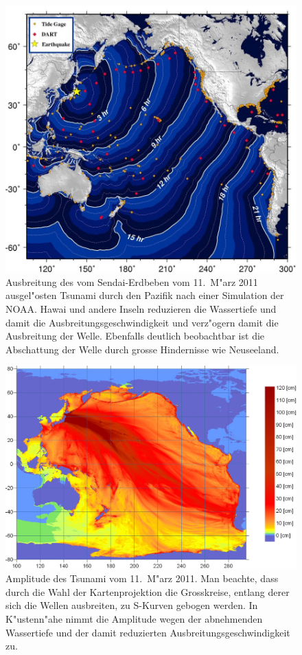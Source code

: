 \begin{figure}
\begin{center}
\includegraphics[width=\hsize]{graphics/sendainoaa}
\end{center}
\caption{Ausbreitung des vom Sendai-Erdbeben vom 11.~M"arz 2011 
ausgel"osten Tsunami durch den Pazifik nach einer Simulation der NOAA.
Hawai und andere Inseln reduzieren die Wassertiefe und damit die
Ausbreitungsgeschwindigkeit und verz"ogern damit die Ausbreitung
der Welle. Ebenfalls deutlich beobachtbar ist die Abschattung 
der Welle durch grosse Hindernisse wie Neuseeland.
\label{tsunamiausbreitung}}
\end{figure}

\begin{figure}
\begin{center}
\includegraphics[width=\hsize]{graphics/sendaienergy}
\end{center}
\caption{Amplitude des Tsunami vom 11.~M"arz 2011.
Man beachte, dass durch die Wahl der Kartenprojektion 
die Grosskreise, entlang derer sich die Wellen ausbreiten,
zu S-Kurven gebogen werden. In K"ustenn"ahe nimmt die
Amplitude wegen der abnehmenden Wassertiefe und der damit
reduzierten Ausbreitungsgeschwindigkeit zu.
\label{tsunamienergie}}
\end{figure}


